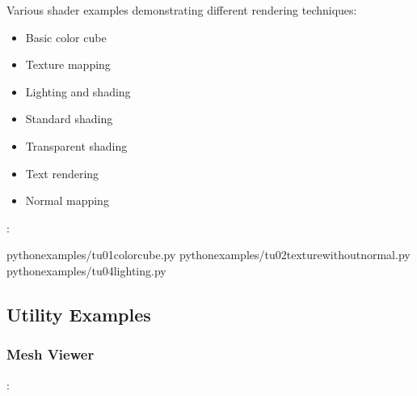 \documentclass[a4paper,10pt,english,openany,oneside]{sphinxmanual}
\begin{document}
\sphinxAtStartPar
Various shader examples demonstrating different rendering techniques:
\begin{itemize}
\item {} 
\sphinxAtStartPar
{} \sphinxhyphen{} Basic color cube

\item {} 
\sphinxAtStartPar
{} \sphinxhyphen{} Texture mapping

\item {} 
\sphinxAtStartPar
{} \sphinxhyphen{} Lighting and shading

\item {} 
\sphinxAtStartPar
{} \sphinxhyphen{} Standard shading

\item {} 
\sphinxAtStartPar
{} \sphinxhyphen{} Transparent shading

\item {} 
\sphinxAtStartPar
{} \sphinxhyphen{} Text rendering

\item {} 
\sphinxAtStartPar
{} \sphinxhyphen{} Normal mapping

\end{itemize}

\sphinxAtStartPar
{}:

\begin{sphinxVerbatim}[commandchars=\\\{\}]
pythonexamples/tu\PYGZus{}01\PYGZus{}color\PYGZus{}cube.py
pythonexamples/tu\PYGZus{}02\PYGZus{}texture\PYGZus{}without\PYGZus{}normal.py
pythonexamples/tu\PYGZus{}04\PYGZus{}lighting.py
\end{sphinxVerbatim}


\subsection{Utility Examples}
\label{\detokenize{examples:utility-examples}}

\subsubsection{Mesh Viewer}
\label{\detokenize{examples:mesh-viewer}}
\sphinxAtStartPar
{}: 
\end{document}
